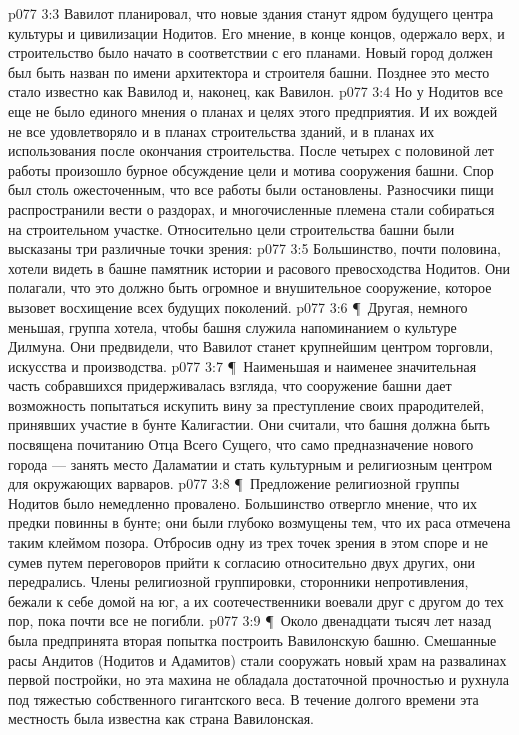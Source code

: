 \vs p077 3:3 Вавилот планировал, что новые здания станут ядром будущего центра культуры и цивилизации Нодитов. Его мнение, в конце концов, одержало верх, и строительство было начато в соответствии с его планами. Новый город должен был быть назван  по имени архитектора и строителя башни. Позднее это место стало известно как Вавилод и, наконец, как Вавилон.
\vs p077 3:4 Но у Нодитов все еще не было единого мнения о планах и целях этого предприятия. И их вождей не все удовлетворяло и в планах строительства зданий, и в планах их использования после окончания строительства. После четырех с половиной лет работы произошло бурное обсуждение цели и мотива сооружения башни. Спор был столь ожесточенным, что все работы были остановлены. Разносчики пищи распространили вести о раздорах, и многочисленные племена стали собираться на строительном участке. Относительно цели строительства башни были высказаны три различные точки зрения:
\vs p077 3:5 \bibnobreakspace Большинство, почти половина, хотели видеть в башне памятник истории и расового превосходства Нодитов. Они полагали, что это должно быть огромное и внушительное сооружение, которое вызовет восхищение всех будущих поколений.
\vs p077 3:6 \P\ \bibnobreakspace Другая, немного меньшая, группа хотела, чтобы башня служила напоминанием о культуре Дилмуна. Они предвидели, что Вавилот станет крупнейшим центром торговли, искусства и производства.
\vs p077 3:7 \P\ \bibnobreakspace Наименьшая и наименее значительная часть собравшихся придерживалась взгляда, что сооружение башни дает возможность попытаться искупить вину за преступление своих прародителей, принявших участие в бунте Калигастии. Они считали, что башня должна быть посвящена почитанию Отца Всего Сущего, что само предназначение нового города --- занять место Даламатии и стать культурным и религиозным центром для окружающих варваров.
\vs p077 3:8 \P\ Предложение религиозной группы Нодитов было немедленно провалено. Большинство отвергло мнение, что их предки повинны в бунте; они были глубоко возмущены тем, что их раса отмечена таким клеймом позора. Отбросив одну из трех точек зрения в этом споре и не сумев путем переговоров прийти к согласию относительно двух других, они передрались. Члены религиозной группировки, сторонники непротивления, бежали к себе домой на юг, а их соотечественники воевали друг с другом до тех пор, пока почти все не погибли.
\vs p077 3:9 \P\ Около двенадцати тысяч лет назад была предпринята вторая попытка построить Вавилонскую башню. Смешанные расы Андитов (Нодитов и Адамитов) стали сооружать новый храм на развалинах первой постройки, но эта махина не обладала достаточной прочностью и рухнула под тяжестью собственного гигантского веса. В течение долгого времени эта местность была известна как страна Вавилонская.
